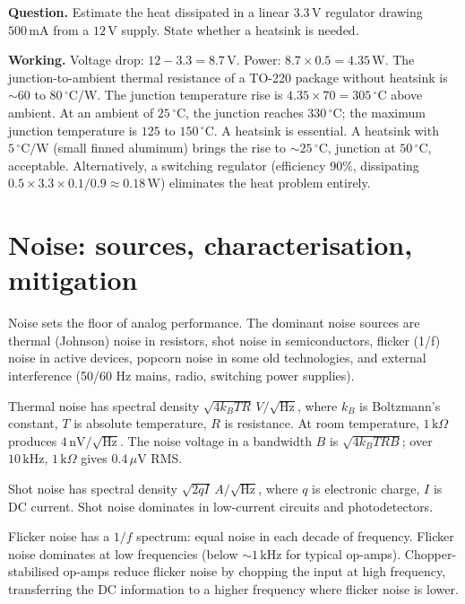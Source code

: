 \begin{estimation}
\textbf{Question.} Estimate the heat dissipated in a linear $3.3\,\text{V}$ regulator drawing $500\,\text{mA}$ from a $12\,\text{V}$ supply. State whether a heatsink is needed.

\textbf{Working.} Voltage drop: $12 - 3.3 = 8.7\,\text{V}$. Power: $8.7 \times 0.5 = 4.35\,\text{W}$. The junction-to-ambient thermal resistance of a TO-220 package without heatsink is $\sim 60$ to $80\,^\circ\text{C}/\text{W}$. The junction temperature rise is $4.35 \times 70 = 305\,^\circ\text{C}$ above ambient. At an ambient of $25\,^\circ\text{C}$, the junction reaches $330\,^\circ\text{C}$; the maximum junction temperature is $125$ to $150\,^\circ\text{C}$. A heatsink is essential. A heatsink with $5\,^\circ\text{C}/\text{W}$ (small finned aluminum) brings the rise to $\sim 25\,^\circ\text{C}$, junction at $50\,^\circ\text{C}$, acceptable. Alternatively, a switching regulator (efficiency $90\%$, dissipating $0.5 \times 3.3 \times 0.1/0.9 \approx 0.18\,\text{W}$) eliminates the heat problem entirely.
\end{estimation}

\section{Noise: sources, characterisation, mitigation}

Noise sets the floor of analog performance. The dominant noise sources are thermal (Johnson) noise in resistors, shot noise in semiconductors, flicker (1/f) noise in active devices, popcorn noise in some old technologies, and external interference (50/60 Hz mains, radio, switching power supplies).

Thermal noise has spectral density $\sqrt{4 k_B T R}\,V/\sqrt{\text{Hz}}$, where $k_B$ is Boltzmann's constant, $T$ is absolute temperature, $R$ is resistance. At room temperature, $1\,\text{k}\Omega$ produces $4\,\text{nV}/\sqrt{\text{Hz}}$. The noise voltage in a bandwidth $B$ is $\sqrt{4 k_B T R B}$; over $10\,\text{kHz}$, $1\,\text{k}\Omega$ gives $0.4\,\mu\text{V}$ RMS.

Shot noise has spectral density $\sqrt{2 q I}\,A/\sqrt{\text{Hz}}$, where $q$ is electronic charge, $I$ is DC current. Shot noise dominates in low-current circuits and photodetectors.

Flicker noise has a $1/f$ spectrum: equal noise in each decade of frequency. Flicker noise dominates at low frequencies (below $\sim 1\,\text{kHz}$ for typical op-amps). Chopper-stabilised op-amps reduce flicker noise by chopping the input at high frequency, transferring the DC information to a higher frequency where flicker noise is lower.

